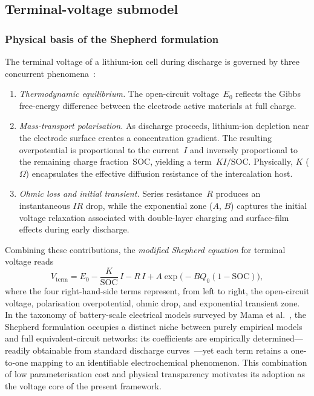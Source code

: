 \documentclass[5p,times,number]{elsarticle}
\begin{document}
\subsection{Terminal-voltage submodel}\label{sec:shepherd}
\subsubsection{Physical basis of the Shepherd formulation}
The terminal voltage of a lithium-ion cell during discharge is governed by three concurrent phenomena~\cite{Shepherd1965}:
\begin{enumerate}[leftmargin=*, label=\arabic*.]
    \item \emph{Thermodynamic equilibrium.} The open-circuit voltage~$E_0$ reflects the Gibbs free-energy difference between the electrode active materials at full charge.
    \item \emph{Mass-transport polarisation.} As discharge proceeds, lithium-ion depletion near the electrode surface creates a concentration gradient.  The resulting overpotential is proportional to the current~$I$ and inversely proportional to the remaining charge fraction~SOC, yielding a term~$K I/\mathrm{SOC}$.  Physically, $K$ ($\Omega$) encapsulates the effective diffusion resistance of the intercalation host.
    \item \emph{Ohmic loss and initial transient.}  Series resistance~$R$ produces an instantaneous $IR$ drop, while the exponential zone ($A$, $B$) captures the initial voltage relaxation associated with double-layer charging and surface-film effects during early discharge.
\end{enumerate}
Combining these contributions, the \emph{modified Shepherd equation} for terminal voltage reads
\begin{equation}\label{eq:shepherd}
V_{\mathrm{term}} = E_0 - \frac{K}{\mathrm{SOC}}\,I - R\,I + A\exp\!\bigl(-B Q_0(1-\mathrm{SOC})\bigr),
\end{equation}
where the four right-hand-side terms represent, from left to right, the open-circuit voltage, polarisation overpotential, ohmic drop, and exponential transient zone.
In the taxonomy of battery-scale electrical models surveyed by Mama et al.~\cite{Mama2025}, the Shepherd formulation occupies a distinct niche between purely empirical models and full equivalent-circuit networks: its coefficients are empirically determined---readily obtainable from standard discharge curves~\cite{Fuller2014}---yet each term retains a one-to-one mapping to an identifiable electrochemical phenomenon.
This combination of low parameterisation cost and physical transparency motivates its adoption as the voltage core of the present framework.
\end{document}

